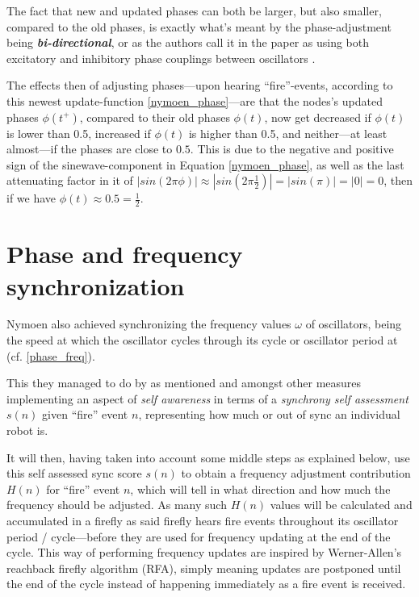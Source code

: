 	The fact that new and updated phases can both be larger, but also smaller, compared to the old phases, is exactly what's meant by the phase-adjustment being \textbf{\textit{bi-directional}}, or as the authors call it in the paper as using both excitatory and inhibitory phase couplings between oscillators \cite{nymoen_synch}.

	The effects then of adjusting phases—upon hearing ``fire''-events, according to this newest update-function \eqref{nymoen_phase}—are that the nodes's updated phases $\phi(t^+)$, compared to their old phases $\phi(t)$, now get decreased if $\phi(t)$ is lower than 0.5, increased if $\phi(t)$ is higher than 0.5, and neither—at least almost—if the phases are close to $0.5$. This is due to the negative and positive sign of the sinewave-component in Equation \eqref{nymoen_phase}, as well as the last attenuating factor in it of $| sin(2\pi\phi) | \approx | sin(2\pi \frac{1}{2}) | = | sin(\pi) | = | 0 | = 0$, then if we have $\phi(t) \approx 0.5 = \frac{1}{2}$.




\section{Phase and frequency synchronization}
\label{sec:nymoen_freq_updates}

	Nymoen also achieved synchronizing the frequency values $\omega$ of oscillators, being the speed at which the oscillator cycles through its cycle or oscillator period at (cf. \eqref{phase_freq}).
	
	This they managed to do by as mentioned and amongst other measures implementing an aspect of \textit{self awareness} in terms of a \textit{synchrony self assessment} $s(n)$ given ``fire'' event $n$, representing how much or out of sync an individual robot is.
	
	It will then, having taken into account some middle steps as explained below, use this self assessed sync score $s(n)$ to obtain a frequency adjustment contribution $H(n)$ for ``fire'' event $n$, which will tell in what direction and how much the frequency should be adjusted. As many such $H(n)$ values will be calculated and accumulated in a firefly as said firefly hears fire events throughout its oscillator period / cycle—before they are used for frequency updating at the end of the cycle. This way of performing frequency updates are inspired by Werner-Allen's reachback firefly algorithm (RFA), simply meaning updates are postponed until the end of the cycle instead of happening immediately as a fire event is received.
	
